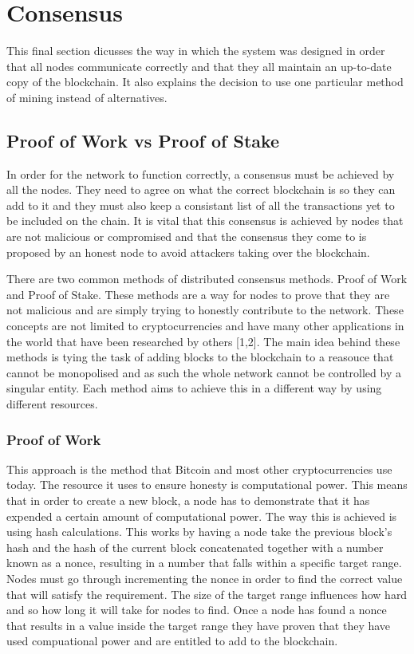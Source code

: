 \documentclass{l4proj}
\begin{document}
\section{Consensus}
This final section dicusses the way in which the system was designed in order that all nodes communicate correctly and
that they all maintain an up-to-date copy of the blockchain. It also explains the decision to 
use one particular method of mining instead of alternatives.

\subsection{Proof of Work vs Proof of Stake}
In order for the network to function correctly, a consensus must be achieved by all the nodes. They need to agree
on what the correct blockchain is so they can add to it and they must also keep a consistant list of all the 
transactions yet to be included on the chain. It is vital that this consensus is achieved by nodes that are not
malicious or compromised and that the consensus they come to is proposed by an honest node to avoid attackers
taking over the blockchain. 

There are two common methods of distributed consensus methods. Proof of Work and Proof of Stake. These methods
are a way for nodes to prove that they are not malicious and are simply trying to honestly contribute to the
network. These concepts are not limited to cryptocurrencies and have many other applications in the world that 
have been researched by others [1,2]. The main idea behind these methods is tying the task of adding blocks to the 
blockchain to a reasouce that cannot be monopolised and as such the whole network cannot be controlled by a 
singular entity. Each method aims to achieve this in a different way by using different resources.

\subsubsection{Proof of Work}
This approach is the method that Bitcoin and most other cryptocurrencies use today. The resource it uses to 
ensure honesty is computational power. This means that in order to create a new block, a node has to demonstrate
that it has expended a certain amount of computational power. The way this is achieved is using hash calculations. 
This works by having a node take the previous block's
hash and the hash of the current block concatenated together with a number known as a nonce, resulting in a number
that falls within a specific target range. Nodes must go through incrementing the nonce in order to find the 
correct value that will satisfy the requirement. The size of the target range influences how hard and so how long
it will take for nodes to find. Once a node has found a nonce that results in a value inside the target range
they have proven that they have used compuational power and are entitled to add to the blockchain.
\end{document}
